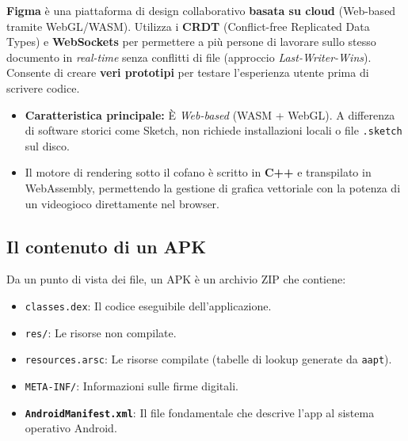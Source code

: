 \begin{tcolorbox}[colback=yellow!10!white,colframe=yellow!70!black,title=Figma nei Quiz]
    \textbf{Figma} è una piattaforma di design collaborativo \textbf{basata su cloud} (Web-based tramite WebGL/WASM).
    Utilizza i \textbf{CRDT} (Conflict-free Replicated Data Types) e \textbf{WebSockets} per permettere a più persone
    di lavorare sullo stesso documento in \textit{real-time} senza conflitti di file (approccio \textit{Last-Writer-Wins}).
    Consente di creare \textbf{veri prototipi} per testare l'esperienza utente prima di scrivere codice.
    \begin{itemize}
        \item \textbf{Caratteristica principale:} È \textit{Web-based} (WASM + WebGL).
        A differenza di software storici come Sketch, non richiede installazioni locali o file \texttt{.sketch} sul disco.
        \item Il motore di rendering sotto il cofano è scritto in \textbf{C++} e transpilato in WebAssembly, permettendo la
        gestione di grafica vettoriale con la potenza di un videogioco direttamente nel browser.
    \end{itemize}
\end{tcolorbox}

\subsection{Il contenuto di un APK}
Da un punto di vista dei file, un APK è un archivio ZIP che contiene:
\begin{itemize}
    \item \texttt{classes.dex}: Il codice eseguibile dell'applicazione.
    \item \texttt{res/}: Le risorse non compilate.
    \item \texttt{resources.arsc}: Le risorse compilate (tabelle di lookup generate da \texttt{aapt}).
    \item \texttt{META-INF/}: Informazioni sulle firme digitali.
    \item \textbf{\texttt{AndroidManifest.xml}}: Il file fondamentale che descrive l'app al sistema operativo Android.
\end{itemize}

